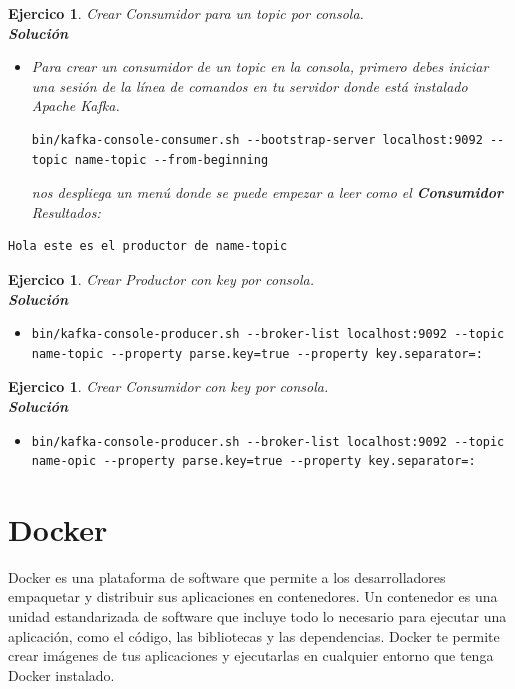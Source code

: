 \documentclass{article}
\newtheorem{ejercicio}[propo]{Ejercico}
\newcommand{\sol}{\textbf{Solución}}
\begin{document}
\begin{ejercicio}
    Crear Consumidor para un topic por consola.\\
    \sol
    \begin{itemize}
        \item Para crear un consumidor de un topic en la consola, primero debes iniciar una sesión de la línea de comandos en tu servidor donde está instalado Apache Kafka.
        \begin{lstlisting}[numbers=none]
            bin/kafka-console-consumer.sh --bootstrap-server localhost:9092 --topic name-topic --from-beginning\end{lstlisting}
        nos despliega un menú donde se puede empezar a leer como el \textbf{Consumidor}\\
        Resultados:        
    \end{itemize}
    \begin{lstlisting}[numbers=none]
    Hola este es el productor de name-topic
\end{lstlisting}
\end{ejercicio}
\begin{ejercicio}
    Crear Productor con key por consola.\\
    \sol
    \begin{itemize}
        \item
        \begin{lstlisting}[numbers=none]
           bin/kafka-console-producer.sh --broker-list localhost:9092 --topic name-topic --property parse.key=true --property key.separator=:\end{lstlisting}
    \end{itemize}
\end{ejercicio}
\begin{ejercicio}
    Crear Consumidor con key por consola.\\
    \sol
    \begin{itemize}
        \item
        \begin{lstlisting}[numbers=none]
            bin/kafka-console-producer.sh --broker-list localhost:9092 --topic name-opic --property parse.key=true --property key.separator=:\end{lstlisting}
    \end{itemize}
\end{ejercicio}

\newpage
\section{Docker}
 Docker es una plataforma de software que permite a los desarrolladores empaquetar y distribuir sus aplicaciones en contenedores. Un contenedor es una unidad estandarizada de software que incluye todo lo necesario para ejecutar una aplicación, como el código, las bibliotecas y las dependencias. Docker te permite crear imágenes de tus aplicaciones y ejecutarlas en cualquier entorno que tenga Docker instalado.
\end{document}
